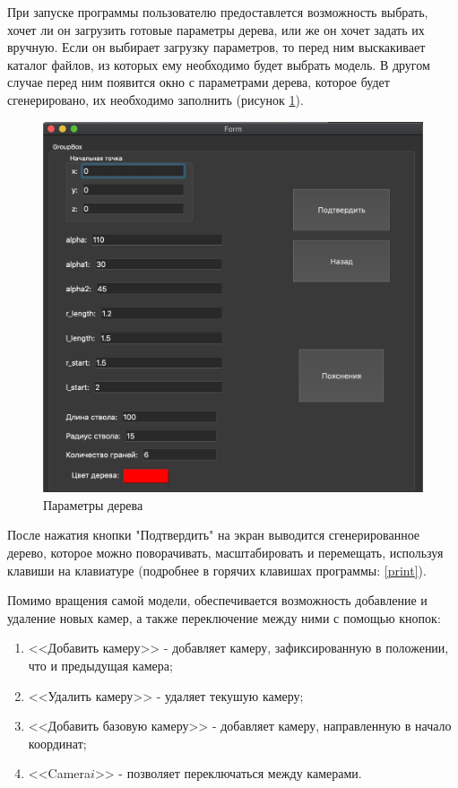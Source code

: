 \documentclass[54pt, a4paper]{article}
\begin{document}
	\newpage
	При запуске программы пользователю предоставлется возможность выбрать, хочет ли он загрузить готовые параметры дерева, или же он хочет задать их вручную. Если он выбирает загрузку параметров, то перед ним выскакивает каталог файлов, из которых ему необходимо будет выбрать модель.	В другом случае перед ним появится окно с параметрами дерева, которое будет сгенерировано, их необходимо заполнить (рисунок \ref{ris:params}).
	\begin{figure}[h!]
		\centering
		\includegraphics[scale=0.2]{img/params.JPG}
		\caption{Параметры дерева}
		\label{ris:params}
	\end{figure}
	
	После нажатия кнопки "Подтвердить" на экран выводится сгенерированное дерево, которое можно поворачивать, масштабировать и перемещать, используя клавиши на клавиатуре (подробнее в горячих клавишах программы: \ref{print}).
	
	Помимо вращения самой модели, обеспечивается возможность добавление и удаление новых камер, а также переключение между ними с помощью кнопок: 
	\begin{enumerate}
		\item <<Добавить камеру>> - добавляет камеру, зафиксированную в положении, что и предыдущая камера;
		\item <<Удалить камеру>> - удаляет текушую камеру;
		\item <<Добавить базовую камеру>> - добавляет камеру, направленную в начало координат;
		\item <<Camera$i$>> - позволяет переключаться между камерами.
	\end{enumerate}
\end{document}
